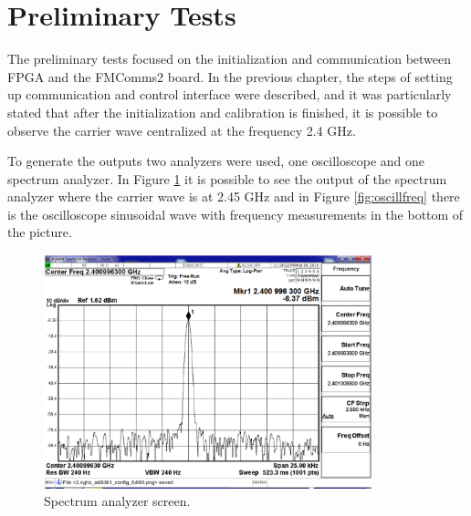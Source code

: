 \vfill
\clearpage

\section{Preliminary Tests}
\label{result:conf}

The preliminary tests focused on the initialization and communication between
FPGA and the FMComms2 board. In the previous chapter, the steps of setting up
communication and control interface were described, and it was particularly
stated that after the initialization and calibration is finished, it is possible
to observe the carrier wave centralized at the frequency 2.4 GHz.

To generate the outputs two analyzers were used, one oscilloscope and one
spectrum analyzer. In Figure \ref{fig:spec} it is possible to see the output of
the spectrum analyzer where the carrier wave is at 2.45 GHz and in Figure
\ref{fig:oscillfreq} there is the oscilloscope sinusoidal wave with frequency
measurements in the bottom of the picture.

\begin{figure}[htbp]
    \centering
    \includegraphics[width=0.85\textwidth]{./figures/spectrum_init}
    \caption{ Spectrum analyzer screen.
    \label{fig:spec}}
\end{figure}



